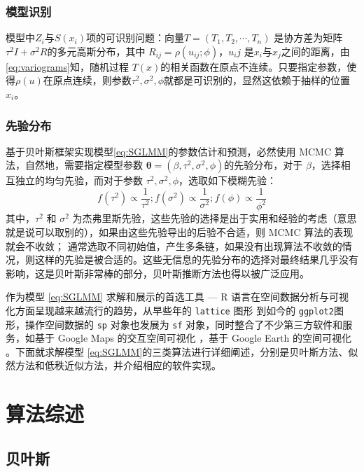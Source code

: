 \documentclass[hyperref, a4paper, UTF8, zihao = -4, linespread = 1.25, scheme = chinese]{ctexbook}
\begin{document}
\subsection{模型识别}

模型中\(Z_{i}\)与\(S(x_i)\)项的可识别问题：向量\(T=(T_1,T_2,\cdots,T_n)\)
是协方差为矩阵 \(\tau^2I+\sigma^2R\)的多元高斯分布，其中
\(R_{ij}=\rho(u_{ij};\phi)\)，\(u_ij\)
是\(x_i\)与\(x_j\)之间的距离，由\eqref{eq:variograms}知，随机过程
\(T(x)\)的相关函数在原点不连续。只要指定参数，使得\(\rho(u)\)在原点连续，则参数\(\tau^2,\sigma^2,\phi\)就都是可识别的，显然这依赖于抽样的位置\(x_i\)\citep{Diggle2002}。

\subsection{先验分布}

基于贝叶斯框架实现模型\eqref{eq:SGLMM}的参数估计和预测，必然使用 MCMC
算法，自然地，需要指定模型参数
\(\bm{\theta} = (\beta,\tau^2,\sigma^2,\phi)\)的先验分布，对于
\(\beta\)，选择相互独立的均匀先验，而对于参数
\(\tau^2,\sigma^2,\phi\)，选取如下模糊先验：
\[f(\tau^2) \propto \frac{1}{\tau^2};f(\sigma^2) \propto \frac{1}{\sigma^2};f(\phi) \propto \frac{1}{\phi^2}\]
其中，\(\tau^2\) 和 \(\sigma^2\)
为杰弗里斯先验，这些先验的选择是出于实用和经验的考虑（意思就是说可以取别的），如果由这些先验导出的后验不合适，则
MCMC 算法的表现就会不收敛；
通常选取不同初始值，产生多条链，如果没有出现算法不收敛的情况，则这样的先验是被合适的。这些无信息的先验分布的选择对最终结果几乎没有影响，这是贝叶斯非常棒的部分，贝叶斯推断方法也得以被广泛应用\citep{mao2006}。

作为模型 \eqref{eq:SGLMM} 求解和展示的首选工具 --- R
语言在空间数据分析与可视化方面呈现越来越流行的趋势，从早些年的
\texttt{lattice} 图形\citep{lattice2008} 到如今的
\texttt{ggplot2}图形\citep{ggplot22016}，操作空间数据的 \texttt{sp}
对象\citep{R-sp}也发展为 \texttt{sf}
对象\citep{R-sf}，同时整合了不少第三方软件和服务，如基于 Google Maps
的交互空间可视化 \citep{plotGoogleMaps2012}，基于 Google Earth
的空间可视化 \citep{plotKML2015}。下面就求解模型
\eqref{eq:SGLMM}的三类算法进行详细阐述，分别是贝叶斯方法、似然方法和低秩近似方法，并介绍相应的软件实现。

\hypertarget{algorithms}{%
\chapter{算法综述}\label{algorithms}}

\section{贝叶斯}
\end{document}
